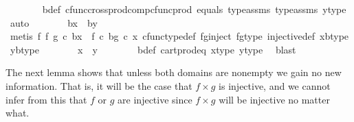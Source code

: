 \begin{isabellebody}
\ \ \ \ \ \ \isamarkupfalse%
\ b{\isacharunderscore}{\kern0pt}def\ cfunc{\isacharunderscore}{\kern0pt}cross{\isacharunderscore}{\kern0pt}prod{\isacharunderscore}{\kern0pt}comp{\isacharunderscore}{\kern0pt}cfunc{\isacharunderscore}{\kern0pt}prod\ equals\ type{\isacharunderscore}{\kern0pt}assms{\isacharparenleft}{\kern0pt}{}{\isacharparenright}{\kern0pt}\ type{\isacharunderscore}{\kern0pt}assms{\isacharparenleft}{\kern0pt}{}{\isacharparenright}{\kern0pt}\ y{\isacharunderscore}{\kern0pt}type{}\ \isamarkupfalse%
\ auto\isanewline
\ \ \ \ \isamarkupfalse%
\ \isamarkupfalse%
\ {\isachardoublequoteopen}{\isasymlangle}b{\isacharcomma}{\kern0pt}x{\isasymrangle}\ {\isacharequal}{\kern0pt}\ {\isasymlangle}b{\isacharcomma}{\kern0pt}y{\isasymrangle}{\isachardoublequoteclose}\isanewline
\ \ \ \ \ \ \isamarkupfalse%
\ {\isacharparenleft}{\kern0pt}metis\ {\isacartoucheopen}{\isacharparenleft}{\kern0pt}f\ {\isasymtimes}\isactrlsub f\ g{\isacharparenright}{\kern0pt}\ {\isasymcirc}\isactrlsub c\ {\isasymlangle}b{\isacharcomma}{\kern0pt}x{\isasymrangle}\ {\isacharequal}{\kern0pt}\ {\isasymlangle}f\ {\isasymcirc}\isactrlsub c\ b{\isacharcomma}{\kern0pt}g\ {\isasymcirc}\isactrlsub c\ x{\isasymrangle}{\isacartoucheclose}\ cfunc{\isacharunderscore}{\kern0pt}type{\isacharunderscore}{\kern0pt}def\ fg{\isacharunderscore}{\kern0pt}inject\ fg{\isacharunderscore}{\kern0pt}type\ injective{\isacharunderscore}{\kern0pt}def\ xb{\isacharunderscore}{\kern0pt}type\ yb{\isacharunderscore}{\kern0pt}type{\isacharparenright}{\kern0pt}\isanewline
\ \ \ \ \isamarkupfalse%
\ \isamarkupfalse%
\ {\isachardoublequoteopen}x\ {\isacharequal}{\kern0pt}\ y{\isachardoublequoteclose}\isanewline
\ \ \ \ \ \ \isamarkupfalse%
\ b{\isacharunderscore}{\kern0pt}def\ cart{\isacharunderscore}{\kern0pt}prod{\isacharunderscore}{\kern0pt}eq{}\ x{\isacharunderscore}{\kern0pt}type{}\ y{\isacharunderscore}{\kern0pt}type{}\ \isamarkupfalse%
\ blast\isanewline
\ \ \isamarkupfalse%
\isanewline
{}\isamarkupfalse%
%
\endisatagproof
{\isafoldproof}%
%
\isadelimproof
%
\endisadelimproof
%
\begin{isamarkuptext}%
The next lemma shows that unless both domains are nonempty we gain no new information. 
That is, it will be the case that $f \times g$ is injective, and we cannot infer from this that $f$ or $g$ are
injective since $f \times g$ will be injective no matter what.%

\end{isamarkuptext}
\end{isabellebody}
